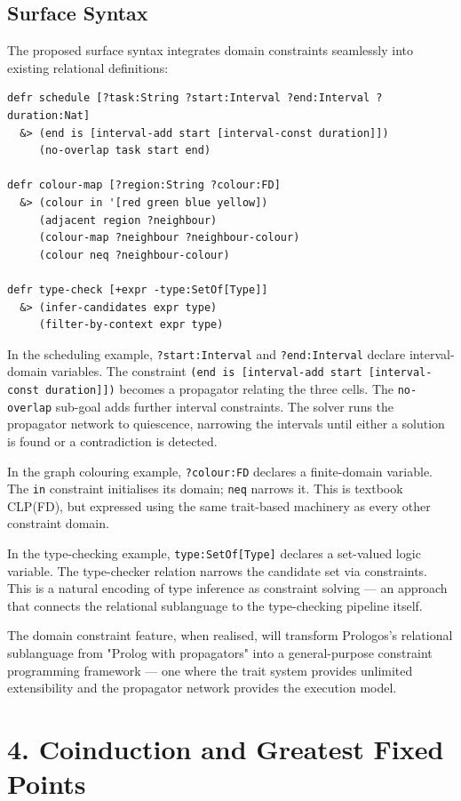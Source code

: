 \documentclass[11pt]{article}
\begin{document}
\subsection{Surface Syntax}
\label{sec:org4969c77}

The proposed surface syntax integrates domain constraints seamlessly into
existing relational definitions:

\begin{verbatim}
defr schedule [?task:String ?start:Interval ?end:Interval ?duration:Nat]
  &> (end is [interval-add start [interval-const duration]])
     (no-overlap task start end)

defr colour-map [?region:String ?colour:FD]
  &> (colour in '[red green blue yellow])
     (adjacent region ?neighbour)
     (colour-map ?neighbour ?neighbour-colour)
     (colour neq ?neighbour-colour)

defr type-check [+expr -type:SetOf[Type]]
  &> (infer-candidates expr type)
     (filter-by-context expr type)
\end{verbatim}

In the scheduling example, \texttt{?start:Interval} and \texttt{?end:Interval} declare
interval-domain variables. The constraint \texttt{(end is [interval-add start
[interval-const duration]])} becomes a propagator relating the three cells. The
\texttt{no-overlap} sub-goal adds further interval constraints. The solver runs the
propagator network to quiescence, narrowing the intervals until either a
solution is found or a contradiction is detected.

In the graph colouring example, \texttt{?colour:FD} declares a finite-domain variable.
The \texttt{in} constraint initialises its domain; \texttt{neq} narrows it. This is
textbook CLP(FD), but expressed using the same trait-based machinery as every
other constraint domain.

In the type-checking example, \texttt{type:SetOf[Type]} declares a set-valued logic
variable. The type-checker relation narrows the candidate set via constraints.
This is a natural encoding of type inference as constraint solving --- an
approach that connects the relational sublanguage to the type-checking pipeline
itself.

The domain constraint feature, when realised, will transform Prologos's
relational sublanguage from "Prolog with propagators" into a general-purpose
constraint programming framework --- one where the trait system provides
unlimited extensibility and the propagator network provides the execution model.
\section{4. Coinduction and Greatest Fixed Points}
\label{sec:orga671046}
\end{document}
